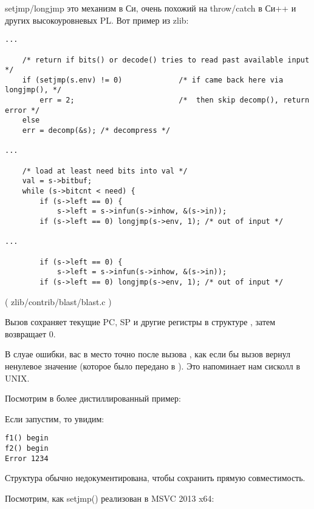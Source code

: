 

setjmp/longjmp это механизм в Си, очень похожий на throw/catch в Си++ и других высокоуровневых \ac{PL}.
Вот пример из zlib:

\begin{lstlisting}[style=customc]
...

    /* return if bits() or decode() tries to read past available input */
    if (setjmp(s.env) != 0)             /* if came back here via longjmp(), */
        err = 2;                        /*  then skip decomp(), return error */
    else
	err = decomp(&s); /* decompress */

...

    /* load at least need bits into val */
    val = s->bitbuf;
    while (s->bitcnt < need) {
        if (s->left == 0) {
            s->left = s->infun(s->inhow, &(s->in));
	    if (s->left == 0) longjmp(s->env, 1); /* out of input */

...

        if (s->left == 0) {
            s->left = s->infun(s->inhow, &(s->in));
	    if (s->left == 0) longjmp(s->env, 1); /* out of input */
\end{lstlisting}
( zlib/contrib/blast/blast.c )

Вызов  сохраняет текущие \ac{PC}, \ac{SP} и другие регистры в структуре , затем возвращает 0.

В слуае ошибки,   вас в место точно после вызова ,
как если бы вызов  вернул ненулевое значение (которое было передано в ).
Это напоминает нам сисколл  в UNIX.

Посмотрим в более дистиллированный пример:



Если запустим, то увидим:

\begin{lstlisting}
f1() begin
f2() begin
Error 1234
\end{lstlisting}

Структура  обычно недокументирована, чтобы сохранить прямую совместимость.

Посмотрим, как setjmp() реализован в MSVC 2013 x64:



